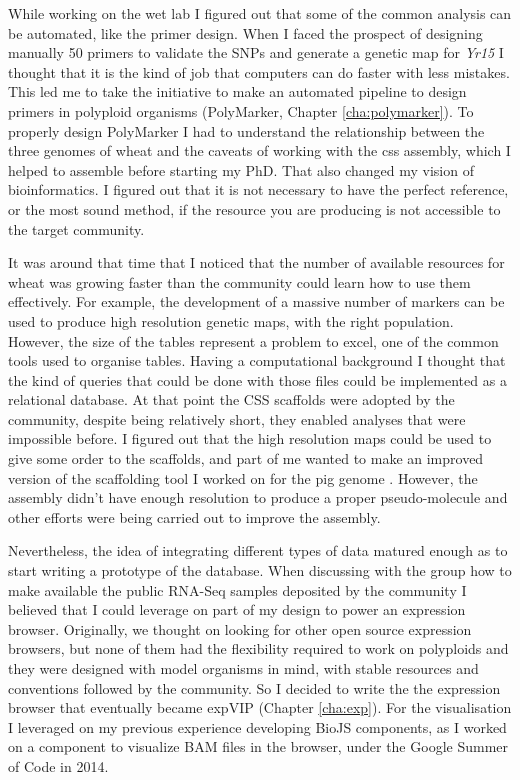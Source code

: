 While working on the wet lab I figured out that some of the common analysis can be automated, like the primer design. 
When I faced the prospect of designing manually 50 primers to validate the SNPs and generate a genetic map for \textit{Yr15} I thought that it is the kind of job that computers can do faster with less mistakes. 
This led me to take the initiative to make an automated pipeline to design primers in polyploid organisms (PolyMarker, Chapter \ref{cha:polymarker}).
To properly design PolyMarker I had to understand the relationship between the three genomes of wheat and the caveats of working with the \acrshort{css} assembly, which I helped to assemble before starting my PhD. 
That also changed my vision of bioinformatics. 
I figured out that it is not necessary to have the perfect reference, or the most sound method, if the resource you are producing is not accessible to the target community. 

It was around that time that I noticed that the number of available resources for wheat was growing faster than the community could learn how to use them effectively. 
For example, the development of a massive number of markers can be used to produce high resolution genetic maps, with the right population. 
However, the size of the tables represent a problem to excel, one of the common tools used to organise tables. 
Having a computational background I thought that the kind of queries that could be done with those files could be implemented as a relational database. 
At that point the CSS scaffolds were adopted by the community, despite being relatively short, they enabled analyses that were impossible before. 
I figured out that the high resolution maps could be used to give some order to the scaffolds, and part of me wanted to make an improved version of the scaffolding tool I worked on for the pig genome \citep{Groenen2012a}.
However, the assembly didn't have enough resolution to produce a proper pseudo-molecule and other efforts were being carried out to improve the assembly.

Nevertheless, the idea of integrating different types of data matured enough as to start writing a prototype of the database. 
When discussing with the group how to make available the public RNA-Seq samples deposited by the community I believed that I could leverage on part of my design to power an expression browser. 
Originally, we thought on looking for other open source expression browsers, but none of them had the flexibility required to work on polyploids and they were designed with model organisms in mind, with stable resources and conventions followed by the community. 
So I decided to write the the expression browser that eventually became expVIP (Chapter \ref{cha:exp}). 
For the visualisation I leveraged on my previous experience developing BioJS components, as I worked on a component to visualize BAM files in the browser, under the Google Summer of Code in 2014. 

